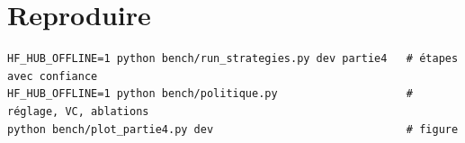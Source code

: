 \documentclass[11pt,a4paper]{article}
\begin{document}
\appendix
\section{Reproduire}
\begin{small}
\begin{verbatim}
HF_HUB_OFFLINE=1 python bench/run_strategies.py dev partie4   # étapes avec confiance
HF_HUB_OFFLINE=1 python bench/politique.py                    # réglage, VC, ablations
python bench/plot_partie4.py dev                              # figure
\end{verbatim}
\end{small}
\end{document}
